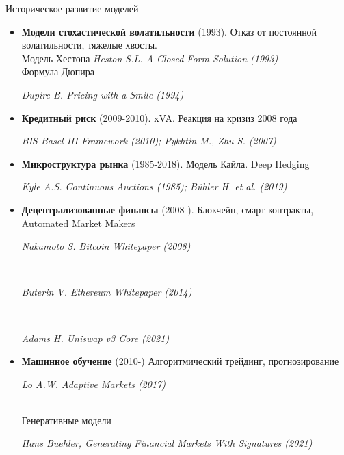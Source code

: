 \documentclass{beamer}
\begin{document}
\begin{frame}{Историческое развитие моделей}
\footnotesize
\begin{itemize}


\item \textbf{Модели стохастической волатильности} (1993). Отказ от постоянной волатильности, тяжелые хвосты. \\
Модель Хестона \scriptsize{\textit{Heston S.L. A Closed-Form Solution (1993)}}
\\Формула Дюпира 
\begin{scriptsize}{\textit{Dupire B. Pricing with a Smile (1994)}}\end{scriptsize}

\item \textbf{Кредитный риск} (2009-2010). xVA. Реакция на кризиз 2008 года \\
\begin{scriptsize}{\textit{BIS Basel III Framework (2010); Pykhtin M., Zhu S. (2007)}}\end{scriptsize}

\item \textbf{Микроструктура рынка} (1985-2018). Модель Кайла. Deep Hedging \\
\begin{scriptsize}{\textit{Kyle A.S. Continuous Auctions (1985); Bühler H. et al. (2019)}}\end{scriptsize}

\item \textbf{Децентрализованные финансы} (2008-). Блокчейн, смарт-контракты, Automated Market Makers\\
\begin{scriptsize}{\textit{Nakamoto S. Bitcoin Whitepaper (2008)}}\end{scriptsize} \\
\begin{scriptsize}{\textit{Buterin V. Ethereum Whitepaper (2014)}}\end{scriptsize} \\
\begin{scriptsize}{\textit{Adams H. Uniswap v3 Core (2021)}}\end{scriptsize}

\item \textbf{Машинное обучение} (2010-) Алгоритмический трейдинг, прогнозирование 
\begin{scriptsize}{\textit{Lo A.W. Adaptive Markets (2017)}}\end{scriptsize}
\\ Генеративные модели
\begin{scriptsize} \textit{Hans Buehler, Generating Financial Markets With Signatures (2021)} \end{scriptsize}
\end{itemize}
\end{frame}
\end{document}
